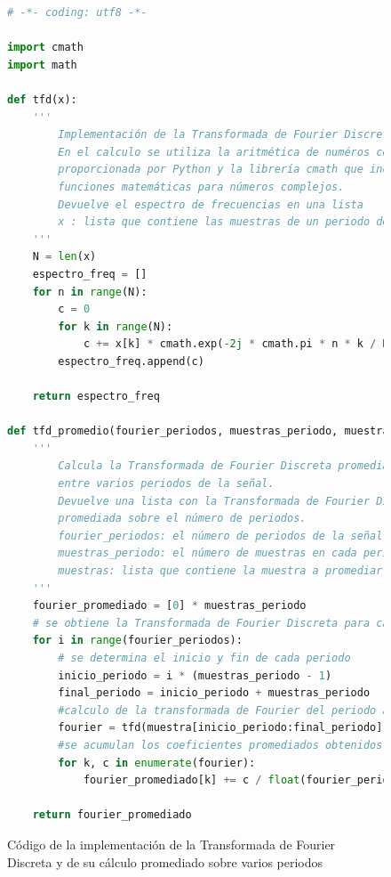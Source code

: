 \documentclass[11pt]{article}
\begin{document}
\begin{figure}
\begin{lstlisting}[language=Python]
# -*- coding: utf8 -*-

import cmath
import math

def tfd(x):
	'''
		Implementación de la Transformada de Fourier Discreta.
		En el calculo se utiliza la aritmética de numéros complejos
		proporcionada por Python y la librería cmath que incluye otras
		funciones matemáticas para números complejos.
		Devuelve el espectro de frecuencias en una lista
		x : lista que contiene las muestras de un periodo de la señal
	'''
	N = len(x)
	espectro_freq = []
	for n in range(N):
		c = 0
		for k in range(N):
			c += x[k] * cmath.exp(-2j * cmath.pi * n * k / N)
		espectro_freq.append(c)

	return espectro_freq 

def tfd_promedio(fourier_periodos, muestras_periodo, muestra):
	'''
		Calcula la Transformada de Fourier Discreta promediada
		entre varios periodos de la señal.
		Devuelve una lista con la Transformada de Fourier Discreta
		promediada sobre el número de periodos.
		fourier_periodos: el número de periodos de la señal
		muestras_periodo: el número de muestras en cada periodo
		muestras: lista que contiene la muestra a promediar
	'''
	fourier_promediado = [0] * muestras_periodo
	# se obtiene la Transformada de Fourier Discreta para cada periodo
	for i in range(fourier_periodos):
		# se determina el inicio y fin de cada periodo
		inicio_periodo = i * (muestras_periodo - 1)
		final_periodo = inicio_periodo + muestras_periodo
		#calculo de la transformada de Fourier del periodo actual
		fourier = tfd(muestra[inicio_periodo:final_periodo])
		#se acumulan los coeficientes promediados obtenidos por cada periodo
		for k, c in enumerate(fourier):
			fourier_promediado[k] += c / float(fourier_periodos)

	return fourier_promediado
\end{lstlisting}
\caption{Código de la implementación de la Transformada de Fourier Discreta y de su cálculo promediado sobre
varios periodos}
\end{figure}
\end{document}
